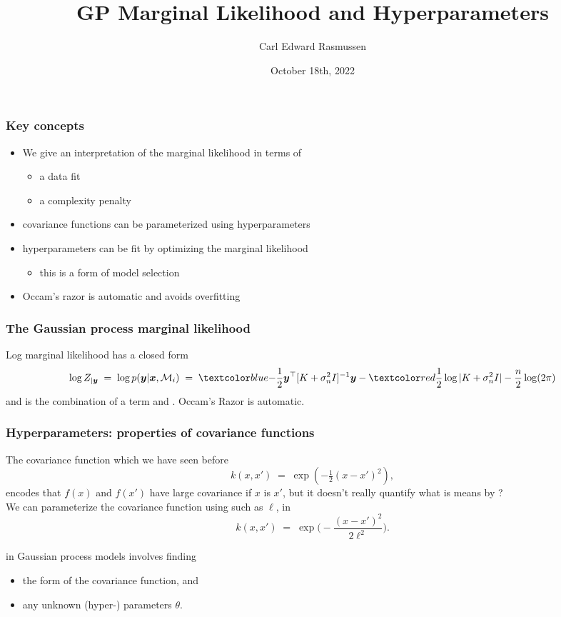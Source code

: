 

\title{GP Marginal Likelihood and Hyperparameters}
\author{Carl Edward Rasmussen}
\date{October 18th, 2022}



\begin{frame}
\titlepage
\end{frame}

\begin{frame}
\frametitle{Key concepts}
\begin{itemize}
\item We give an interpretation of the marginal likelihood in terms of
\begin{itemize}
\item a data fit
\item a complexity penalty
\end{itemize}
\item covariance functions can be parameterized using hyperparameters
\item hyperparameters can be fit by optimizing the marginal likelihood
\begin{itemize}
\item this is a form of model selection
\end{itemize}
\item Occam's razor is automatic and avoids overfitting
\end{itemize}
\end{frame}

\begin{frame}
\frametitle{The Gaussian process marginal likelihood}

Log marginal likelihood has a closed form
\[
\log Z_{|\bfy}\;=\;\log p(\bfy|\bfx,\mathcal{M}_i)\;=\;\Blue{-\frac{1}{2}\bfy
^\top [K+\sigma_n^2I]^{-1}\bfy}
-\Red{\frac{1}{2}\log|K+\sigma_n^2I|}-\frac{n}{2}\log(2\pi)
\]
and is the combination of a  term and .
Occam's Razor is automatic.
\end{frame}


\begin{frame}
\frametitle{Hyperparameters: properties of covariance functions}

The covariance function which we have seen before
\[
k(x,x')\;=\;\exp(-\tfrac{1}{2}(x-x')^2),
\]
encodes that $f(x)$ and $f(x')$ have large covariance if $x$ is
 $x'$, but it doesn't really quantify what is means by
?\\[1ex]

We can parameterize the covariance function using  such as $\ell$, in
\[
k(x,x')\;=\;\exp\big(-\frac{(x-x')^2}{2\ell^2}\big).
\]

 in Gaussian process models involves finding
\begin{itemize}
\item the form of the covariance function, and
\item any unknown (hyper-) parameters $\theta$.
\end{itemize}

\end{frame}

